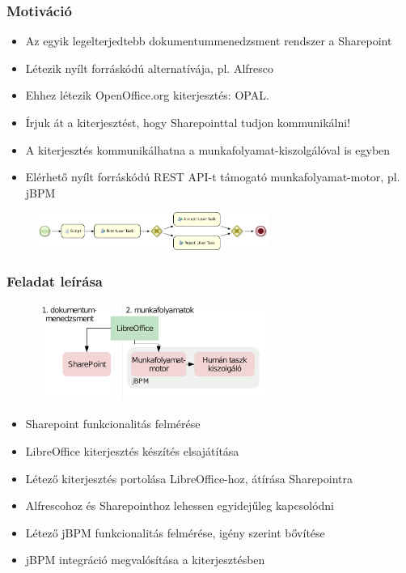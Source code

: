 \documentclass{beamer}
\begin{document}
\begin{frame}
\frametitle{Motiváció}
\begin{itemize}
\item Az egyik legelterjedtebb dokumentummenedzsment rendszer a Sharepoint
\item Létezik nyílt forráskódú alternatívája, pl. Alfresco
\item Ehhez létezik OpenOffice.org kiterjesztés: OPAL.
\item Írjuk át a kiterjesztést, hogy Sharepointtal tudjon kommunikálni!
\item A kiterjesztés kommunikálhatna a munkafolyamat-kiszolgálóval is egyben
\item Elérhető nyílt forráskódú REST API-t támogató munkafolyamat-motor, pl. jBPM
\end{itemize}
\begin{figure}[H]
\includegraphics[width=75mm,keepaspectratio]{decision-bpmn.png}
\end{figure}
\end{frame}

\begin{frame}
\frametitle{Feladat leírása}
\begin{figure}[H]
\includegraphics[width=75mm,keepaspectratio]{test-arch-wf-hu.pdf}
\end{figure}
\begin{itemize}
\item Sharepoint funkcionalitás felmérése
\item LibreOffice kiterjesztés készítés elsajátítása
\item Létező kiterjesztés portolása LibreOffice-hoz, átírása Sharepointra
\item Alfrescohoz és Sharepointhoz lehessen egyidejűleg kapcsolódni
\item Létező jBPM funkcionalitás felmérése, igény szerint bővítése
\item jBPM integráció megvalósítása a kiterjesztésben
\end{itemize}
\end{frame}
\end{document}
